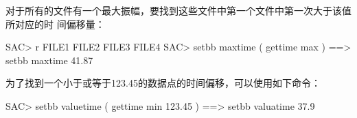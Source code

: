 对于所有的文件有一个最大振幅，要找到这些文件中第一个文件中第一次大于该值所对应的时
间偏移量：
\begin{SACCode}
SAC> r FILE1 FILE2 FILE3 FILE4
SAC> setbb maxtime ( gettime max )
 ==> setbb maxtime 41.87
\end{SACCode}

为了找到一个小于或等于123.45的数据点的时间偏移，可以使用如下命令：
\begin{SACCode}
SAC> setbb valuetime ( gettime min 123.45 )
 ==> setbb valuatime 37.9 
\end{SACCode}
